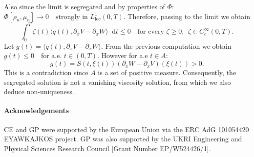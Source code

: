 \documentclass[a4paper,twosided, 11pt]{article}
\theoremstyle{plain}
\theoremstyle{remark}
\newcommand{\diff}{\mathop{} \mathrm{d}}
\numberwithin{equation}{section}
\begin{document}
Also since the limit is segregated and by properties of $\Phi$: 
$\Phi[\rho_n,\mu_n]\to 0 \quad\text{strongly in }L^1_{\mathrm{loc}}(0,T).$ Therefore, passing to the limit we obtain
\begin{equation*}
\int_0^T \zeta(t)\langle q(t),\partial_x V-\partial_x W\rangle\diff t\le0
\quad \text{for every } \zeta\ge 0,\; \, \zeta\in C_c^\infty(0,T).
\end{equation*}
Let $g(t)=\langle q(t),\partial_x V-\partial_x W\rangle$. From the previous computation we obtain $g(t)\le 0 \quad\text{for a.e. }t\in(0,T).$
However for a.e $t\in A$: 
$$
g(t) =S(t,\xi(t)) (\partial_xW-\partial_xV)(\xi(t))>0.
$$
This is a contradiction since $A$ is a set of positive measure. 
Consequently, the segregated solution is not a vanishing viscosity solution, from which we also deduce non-uniqueness.



\paragraph{Acknowledgements}
CE and GP were supported by the European Union via the ERC
AdG 101054420 EYAWKAJKOS project.
GP was also supported by the UKRI Engineering and Physical Sciences Research Council [Grant Number EP/W524426/1].


\end{document}
